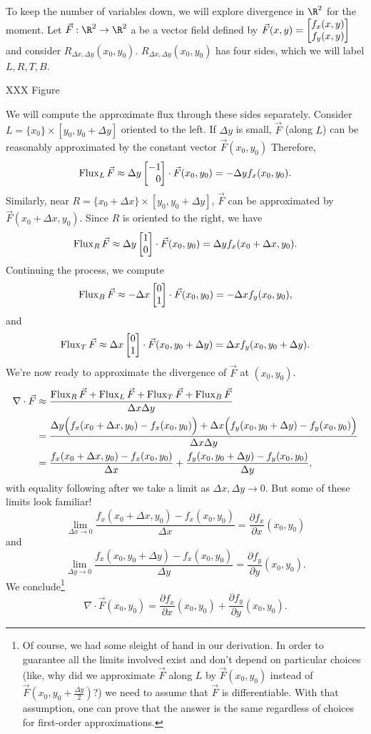 \bigskip
To keep the number of variables down, we will explore divergence in $\R^2$ for the moment.
Let $\vec F:\R^2\to\R^2$ a be a vector field defined by
$\vec F(x,y)=\mat{f_x(x,y)\\f_y(x,y)}$ and consider $R_{\Delta x,\Delta y}(x_0,y_0)$.
$R_{\Delta x,\Delta y}(x_0,y_0)$ has four sides, which we will label $L,R,T,B$.

XXX Figure

We will compute the approximate flux through these sides separately.  Consider 
$L=\{x_0\}\times[y_0,y_0+\Delta y]$ oriented to the left.  If $\Delta y$ is small,
$\vec F$ (along $L$) can be reasonably approximated by the constant vector
$\vec F(x_0,y_0)$  Therefore,
\[
	\Flux_{L}\vec F \approx \Delta y \mat{-1\\0}\cdot \vec F(x_0,y_0) = -\Delta y f_x(x_0,y_0).
\]
Similarly, near $R=\{x_0+\Delta x\}\times [y_0,y_0+\Delta y]$, $\vec F$ can be approximated
by $\vec F(x_0+\Delta x,y_0)$.  Since $R$ is oriented to the right, we have
\[
	\Flux_{R}\vec F \approx \Delta y \mat{1\\0}\cdot \vec F(x_0,y_0) = \Delta y f_x(x_0+\Delta x,y_0).
\]
Continuing the process, we compute
\[
	\Flux_{B}\vec F \approx -\Delta x\mat{0\\1}\cdot \vec F(x_0,y_0) = -\Delta x f_y(x_0,y_0),
\]
and
\[
	\Flux_{T}\vec F \approx \Delta x\mat{0\\1}\cdot \vec F(x_0,y_0+\Delta y) = \Delta x f_y(x_0,y_0+\Delta y).
\]
We're now ready to approximate the divergence of $\vec F$ at $(x_0,y_0)$.
\begin{align*}
	\nabla \cdot \vec F &\approx \frac{\operatorname{Flux}_R\vec F + \operatorname{Flux}_L\vec F + \operatorname{Flux}_T\vec F + \operatorname{Flux}_B\vec F}{\Delta x\Delta y}\\
		&= \frac{\Delta y\Big( f_x(x_0+\Delta x,y_0) - f_x(x_0,y_0)\Big)
		+\Delta x\Big( f_y(x_0,y_0+\Delta y) - f_y(x_0,y_0)\Big)}{\Delta x\Delta y}\\
		& = \frac{f_x(x_0+\Delta x,y_0) - f_x(x_0,y_0)}{\Delta x} + 
			\frac{f_y(x_0,y_0+\Delta y) - f_y(x_0,y_0)}{\Delta y},
\end{align*}
with equality following after we take a limit as $\Delta x,\Delta y\to 0$.  But some of these
limits look familiar!
\[
	\lim_{\Delta x\to 0} \frac{f_x(x_0+\Delta x,y_0) - f_x(x_0,y_0)}{\Delta x} 
	= \frac{\partial f_x}{\partial x}(x_0,y_0)
\]
and
\[
	\lim_{\Delta y\to 0} \frac{f_x(x_0,y_0+\Delta y) - f_x(x_0,y_0)}{\Delta y}
	= \frac{\partial f_y}{\partial y}(x_0,y_0).
\]
We conclude\footnote{ Of course, we had some sleight of hand in our derivation.  In order
to guarantee  all the limits involved exist and don't depend on particular choices
(like, why did we approximate $\vec F$ along $L$ by $\vec F(x_0,y_0)$ instead of
$\vec F(x_0,y_0+\tfrac{\Delta y}{2})$?) we need to assume that $\vec F$ is differentiable.
With that assumption, one can prove that the answer is the same regardless of choices
for first-order approximations.}
\[
	\nabla \cdot \vec F(x_0,y_0) = \frac{\partial f_x}{\partial x}(x_0,y_0)
	+ \frac{\partial f_y}{\partial y}(x_0,y_0).
\]

